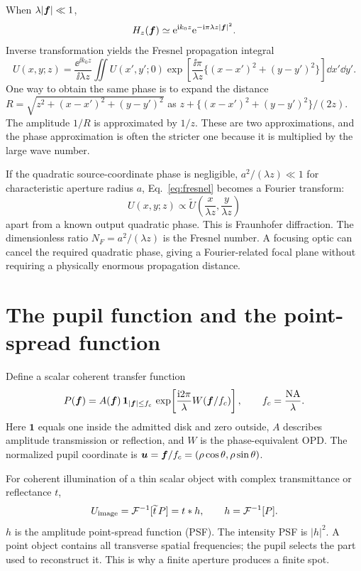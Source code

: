 When $\lambda|\bm{f}|\ll1$,
\begin{equation}
H_z(\bm{f})\simeq
\mathrm{e}^{\mathrm{i} k_0z}\mathrm{e}^{-\mathrm{i}\pi\lambda z|\bm{f}|^2}.
\label{eq:fresneltransfer}
\end{equation}
Inverse transformation yields the Fresnel propagation integral
\begin{equation}
U(x,y;z)=\frac{\ee^{\ii k_0z}}{\ii\lambda z}
\iint U(x',y';0)
\exp\!\left[\frac{\ii\pi}{\lambda z}
\{(x-x')^2+(y-y')^2\}\right]\dd x'\dd y'.
\label{eq:fresnel}
\end{equation}
One way to obtain the same phase is to expand the distance
$R=\sqrt{z^2+(x-x')^2+(y-y')^2}$ as
$z+\{(x-x')^2+(y-y')^2\}/(2z)$.
The amplitude $1/R$ is approximated by $1/z$.
These are two approximations, and the phase approximation is often
the stricter one because it is multiplied by the large wave number.

If the quadratic source-coordinate phase is negligible,
$a^2/(\lambda z)\ll1$ for characteristic aperture radius $a$,
Eq.~\eqref{eq:fresnel} becomes a Fourier transform:
\[
U(x,y;z)\propto
\widetilde U\!\left(\frac{x}{\lambda z},\frac{y}{\lambda z}\right)
\]
apart from a known output quadratic phase. This is Fraunhofer diffraction.
The dimensionless ratio $N_F=a^2/(\lambda z)$ is the Fresnel number.
A focusing optic can cancel the required quadratic phase, giving a
Fourier-related focal plane without requiring a physically enormous
propagation distance.

\section{The pupil function and the point-spread function}
Define a scalar coherent transfer function
\begin{equation}
P(\bm{f})=A(\bm{f})\,
\mathbf1_{|\bm{f}|\leq f_c}\,
\exp\!\left[\frac{\mathrm{i}2\pi}{\lambda}W(\bm{f}/f_c)\right],
\qquad f_c=\frac{\mathrm{NA}}{\lambda}.
\label{eq:pupil}
\end{equation}
Here $\mathbf1$ equals one inside the admitted disk and zero outside,
$A$ describes amplitude transmission or reflection, and $W$ is the
phase-equivalent OPD. The normalized pupil coordinate is
$\bm{u}=\bm{f}/f_c=(\rho\cos\theta,\rho\sin\theta)$.

For coherent illumination of a thin scalar object with complex
transmittance or reflectance $t$,
\begin{equation}
U_{\rm image}=\mathcal{F}^{-1}[\widetilde t\,P]=t*h,\qquad
h=\mathcal{F}^{-1}[P].
\label{eq:coherentimage}
\end{equation}
$h$ is the amplitude point-spread function (PSF).
The intensity PSF is $|h|^2$. A point object contains all transverse
spatial frequencies; the pupil selects the part used to reconstruct it.
This is why a finite aperture produces a finite spot.

